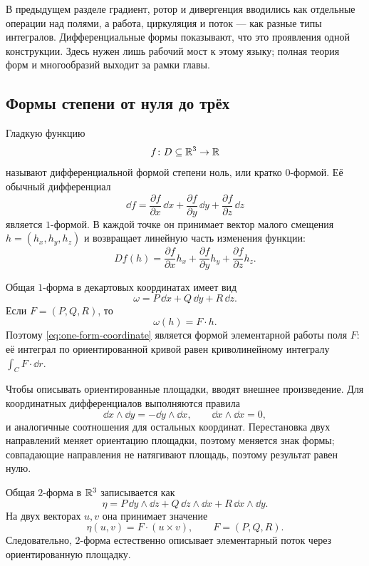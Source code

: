 В предыдущем разделе градиент, ротор и дивергенция вводились как отдельные операции над полями, а работа, циркуляция и поток --- как разные типы интегралов. Дифференциальные формы показывают, что это проявления одной конструкции. Здесь нужен лишь рабочий мост к этому языку; полная теория форм и многообразий выходит за рамки главы.

\subsection{Формы степени от нуля до трёх}

Гладкую функцию
\[
f\colon D\subseteq\mathbb{R}^3\to\mathbb{R}
\]
называют дифференциальной формой степени ноль, или кратко \(0\)-формой. Её обычный дифференциал
\[
\dd f
=
\frac{\partial f}{\partial x}\,\dd x
+
\frac{\partial f}{\partial y}\,\dd y
+
\frac{\partial f}{\partial z}\,\dd z
\]
является \(1\)-формой. В каждой точке он принимает вектор малого смещения
\(h=(h_x,h_y,h_z)\) и возвращает линейную часть изменения функции:
\[
Df(h)
=
\frac{\partial f}{\partial x}h_x
+
\frac{\partial f}{\partial y}h_y
+
\frac{\partial f}{\partial z}h_z.
\]

Общая \(1\)-форма в декартовых координатах имеет вид
\begin{equation}
\label{eq:one-form-coordinate}
\omega
=P\,\dd x+Q\,\dd y+R\,\dd z.
\end{equation}
Если \(F=(P,Q,R)\), то
\[
\omega(h)=F\cdot h.
\]
Поэтому \eqref{eq:one-form-coordinate} является формой элементарной работы поля \(F\): её интеграл по ориентированной кривой равен криволинейному интегралу \(\int_C F\cdot\dd r\).

Чтобы описывать ориентированные площадки, вводят внешнее произведение. Для координатных дифференциалов выполняются правила
\[
\dd x\wedge\dd y=-\dd y\wedge\dd x,
\qquad
\dd x\wedge\dd x=0,
\]
и аналогичные соотношения для остальных координат. Перестановка двух направлений меняет ориентацию площадки, поэтому меняется знак формы; совпадающие направления не натягивают площадь, поэтому результат равен нулю.

Общая \(2\)-форма в \(\mathbb{R}^3\) записывается как
\begin{equation}
\label{eq:two-form-coordinate}
\eta
=P\,\dd y\wedge\dd z
+Q\,\dd z\wedge\dd x
+R\,\dd x\wedge\dd y.
\end{equation}
На двух векторах \(u,v\) она принимает значение
\[
\eta(u,v)=F\cdot(u\times v),
\qquad
F=(P,Q,R).
\]
Следовательно, \(2\)-форма естественно описывает элементарный поток через ориентированную площадку.


